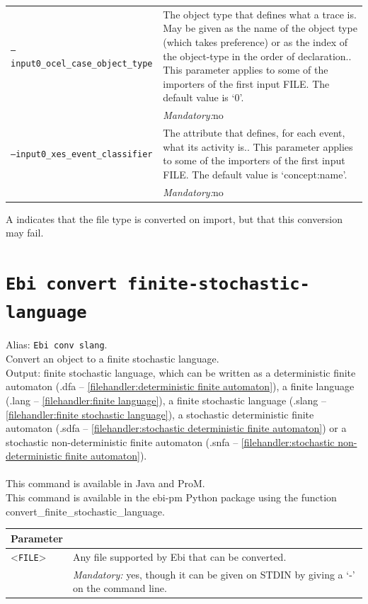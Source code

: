 {\begin{tabularx}{\linewidth}{lX}
\texttt{--input0\_ocel\_case\_object\_type} & The object type that defines what a trace is. May be given as the name of the object type (which takes preference) or as the index of the object-type in the order of declaration.. This parameter applies to some of the importers of the first input FILE. The default value is `0'.\\
&\textit{Mandatory:}\quad no\\
\texttt{--input0\_xes\_event\_classifier} & The attribute that defines, for each event, what its activity is.. This parameter applies to some of the importers of the first input FILE. The default value is `concept:name'.\\
&\textit{Mandatory:}\quad no\\
\bottomrule
\end{tabularx}
A \textdagger{} indicates that the file type is converted on import, but that this conversion may fail.
\clearpage\section{\texttt{Ebi convert finite-stochastic-language}}
\label{command:Ebi convert finite-stochastic-language}
Alias: \texttt{Ebi conv slang}.\\
Convert an object to a finite stochastic language.\\
\noindent Output: finite stochastic language, which can be written as a deterministic finite automaton (.dfa -- \cref{filehandler:deterministic finite automaton}), a finite language (.lang -- \cref{filehandler:finite language}), a finite stochastic language (.slang -- \cref{filehandler:finite stochastic language}), a stochastic deterministic finite automaton (.sdfa -- \cref{filehandler:stochastic deterministic finite automaton}) or a stochastic non-deterministic finite automaton (.snfa -- \cref{filehandler:stochastic non-deterministic finite automaton}).\\
\\This command is available in Java and ProM.
\\This command is available in the ebi-pm Python package using the function convert\_finite\_stochastic\_language.
\begin{tabularx}{\linewidth}{lX}
\toprule
Parameter \\\midrule
<\texttt{FILE}>&Any file supported by Ebi that can be converted.\\
&\textit{Mandatory:} \quad yes, though it can be given on STDIN by giving a `-' on the command line.\\

\end{tabularx}}
